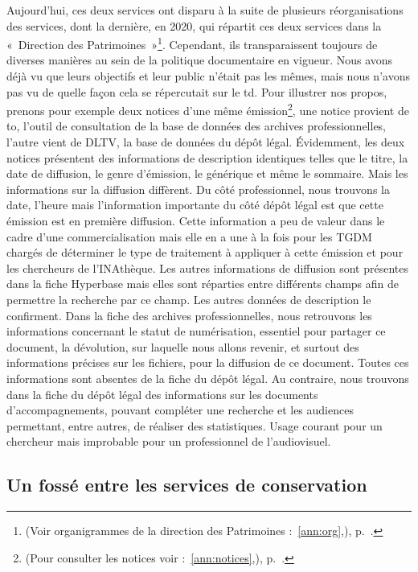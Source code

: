 Aujourd’hui, ces deux services ont disparu à la suite de plusieurs réorganisations des services, dont la dernière, en 2020, qui répartit ces deux services dans la « Direction des Patrimoines »\footnote{(Voir organigrammes de la direction des Patrimoines :~\ref{ann:org},), p.~\pageref{ann:org}.}. Cependant, ils transparaissent toujours de diverses manières au sein de la politique documentaire en vigueur. Nous avons déjà vu que leurs objectifs et leur public n’était pas les mêmes, mais nous n’avons pas vu de quelle façon cela se répercutait sur le \gls{td}. Pour illustrer nos propos, prenons pour exemple deux notices d’une même émission\footnote{(Pour consulter les notices voir :~\ref{ann:notices},), p.~\pageref{ann:notices}.}, une notice provient de \gls{to}, l'outil de consultation de la base de données des archives professionnelles, l’autre vient de DLTV, la base de données du dépôt légal. Évidemment, les deux notices présentent des informations de description identiques telles que le titre, la date de diffusion, le genre d’émission, le générique et même le sommaire. Mais les informations sur la diffusion diffèrent. Du côté professionnel, nous trouvons la date, l’heure mais l’information importante du côté dépôt légal est que cette émission est en première diffusion. Cette information a peu de valeur dans le cadre d’une commercialisation mais elle en a une à la fois pour les TGDM chargés de déterminer le type de traitement à appliquer à cette émission et pour les chercheurs de l’INAthèque. Les autres informations de diffusion sont présentes dans la fiche Hyperbase mais elles sont réparties entre différents champs afin de permettre la recherche par ce champ. Les autres données de description le confirment. Dans la fiche des archives professionnelles, nous retrouvons les informations concernant le statut de numérisation, essentiel pour partager ce document, la dévolution, sur laquelle nous allons revenir, et surtout des informations précises sur les fichiers, pour la diffusion de ce document. Toutes ces informations sont absentes de la fiche du dépôt légal. Au contraire, nous trouvons dans la fiche du dépôt légal des informations sur les documents d’accompagnements, pouvant compléter une recherche et les audiences permettant, entre autres, de réaliser des statistiques. Usage courant pour un chercheur mais improbable pour un professionnel de l'audiovisuel.

\subsection{Un fossé entre les services de conservation} 

